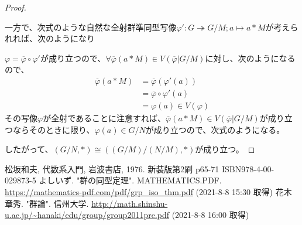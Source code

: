 \documentclass[dvipdfmx]{jsarticle}
\begin{document}
\begin{proof}
\begin{center}
\end{center}
一方で、次式のような自然な全射群準同型写像$\varphi':G \twoheadrightarrow {G}/{M};a \mapsto a*M$が考えられれば、次のようになり
\begin{center}
\end{center}
$\varphi = \overline{\varphi} \circ \varphi'$が成り立つので、$\forall\overline{\varphi}(a*M) \in V\left( \overline{\varphi}|{G}/{M} \right)$に対し、次のようになるので、
\begin{align*}
\overline{\varphi}(a*M) &= \overline{\varphi}\left( \varphi'(a) \right)\\
&= \overline{\varphi} \circ \varphi'(a)\\
&= \varphi(a) \in V(\varphi)
\end{align*}
その写像$\varphi$が全射であることに注意すれば、$\overline{\varphi}(a*M) \in V\left( \overline{\varphi}|{G}/{M} \right)$が成り立つならそのときに限り、$\varphi(a) \in {G}/{N}$が成り立つので、次式のようになる。
\begin{center}
\end{center}
したがって、$\left( {G}/{N},* \right) \cong \left( {\left( {G}/{M} \right)}/{(N/M)},* \right)$が成り立つ。
\end{proof}
\begin{thebibliography}{50}
  松坂和夫, 代数系入門, 岩波書店, 1976. 新装版第2刷 p65-71 ISBN978-4-00-029873-5
  よしいず. "群の同型定理". MATHEMATICS.PDF. \url{https://mathematics-pdf.com/pdf/grp_iso_thm.pdf} (2021-8-8 15:30 取得)
  花木章秀. "群論". 信州大学. \url{http://math.shinshu-u.ac.jp/~hanaki/edu/group/group2011pre.pdf} (2021-8-8 16:00 取得)
\end{thebibliography}
\end{document}
